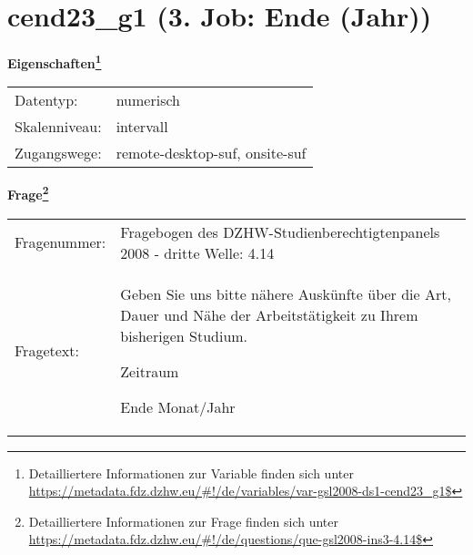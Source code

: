 
    \setcounter{footnote}{0}

    \vspace*{-1.8cm}
	\section{cend23\_g1 (3. Job: Ende (Jahr))}
	\label{section:cend23_g1}



    \vspace*{0.5cm}
    \noindent\textbf{Eigenschaften\footnote{Detailliertere Informationen zur Variable finden sich unter
		\url{https://metadata.fdz.dzhw.eu/\#!/de/variables/var-gsl2008-ds1-cend23_g1$}}}\\
	\begin{tabularx}{\hsize}{@{}lX}
	Datentyp: & numerisch \\
	Skalenniveau: & intervall \\
	Zugangswege: &
	  remote-desktop-suf, 
	  onsite-suf
 \\
    \end{tabularx}



				\vspace*{0.5cm}
                \noindent\textbf{Frage\footnote{Detailliertere Informationen zur Frage finden sich unter
		              \url{https://metadata.fdz.dzhw.eu/\#!/de/questions/que-gsl2008-ins3-4.14$}}}\\
				\begin{tabularx}{\hsize}{@{}lX}
					Fragenummer: &
					  Fragebogen des DZHW-Studienberechtigtenpanels 2008 - dritte Welle:
					  4.14
 \\
					Fragetext: & Geben Sie uns bitte nähere Auskünfte über die Art, Dauer und Nähe der Arbeitstätigkeit zu Ihrem bisherigen Studium.\par  Zeitraum\par  Ende Monat/Jahr \\
				\end{tabularx}





